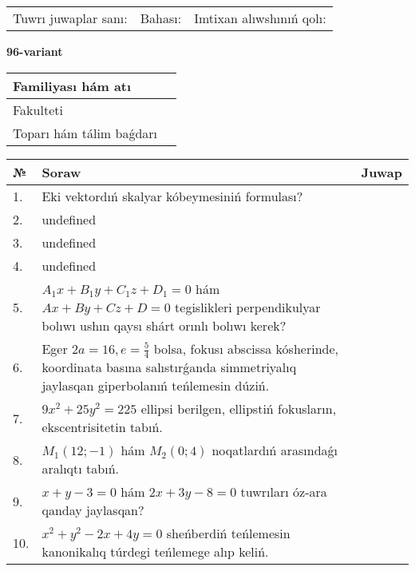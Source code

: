 \documentclass{article}
\begin{document}
\vspace{0.7cm}

\begin{tabular}{lll}
Tuwrı juwaplar sanı: \underline{\hspace{1cm}} & 
Bahası: \underline{\hspace{1cm}} & 
Imtixan alıwshınıń qolı: \underline{\hspace{2cm}} \\
\end{tabular}

\egroup

\newpage


\textbf{96-variant}\\

\bgroup
\def\arraystretch{1.6} %

\begin{tabular}{|m{5.7cm}|m{9.5cm}|}
\hline
Familiyası hám atı & \\
\hline
Fakulteti  & \\
\hline
Toparı hám tálim baǵdarı  & \\
\hline
\end{tabular}

\vspace{0.7cm}

\begin{tabular}{|m{0.7cm}|m{10cm}|m{4cm}|}
\hline
№ & Soraw & Juwap \\
\hline
1. & Eki vektordıń skalyar kóbeymesiniń formulası? &  \\
\hline
2. & undefined &  \\
\hline
3. & undefined &  \\
\hline
4. & undefined &  \\
\hline
5. & \(A_{1}x + B_{1}y + C_{1}z + D_{1} = 0\) hám \(Ax + By + Cz + D = 0\) tegislikleri perpendikulyar bolıwı ushın qaysı shárt orınlı bolıwı kerek? &  \\
\hline
6. & Eger \(2 a = 16, e = \frac{5}{4}\) bolsa, fokusı abscissa kósherinde, koordinata basına salıstırǵanda simmetriyalıq jaylasqan giperbolanıń teńlemesin dúziń. &  \\
\hline
7. & \(9 x^{2} + 25 y^{2} = 225\) ellipsi berilgen, ellipstiń fokusların, ekscentrisitetin tabıń. &  \\
\hline
8. & \(M_{1} (12; - 1)\) hám \(M_{2} (0;4)\) noqatlardıń arasındaǵı aralıqtı tabıń. &  \\
\hline
9. & \(x + y - 3 = 0\) hám \(2 x + 3 y - 8 = 0\) tuwrıları óz-ara qanday jaylasqan? &  \\
\hline
10. & \(x^{2} + y^{2} - 2 x + 4 y = 0\) sheńberdiń teńlemesin kanonikalıq túrdegi teńlemege alıp keliń. & \\
\hline
\end{tabular}
\end{document}
